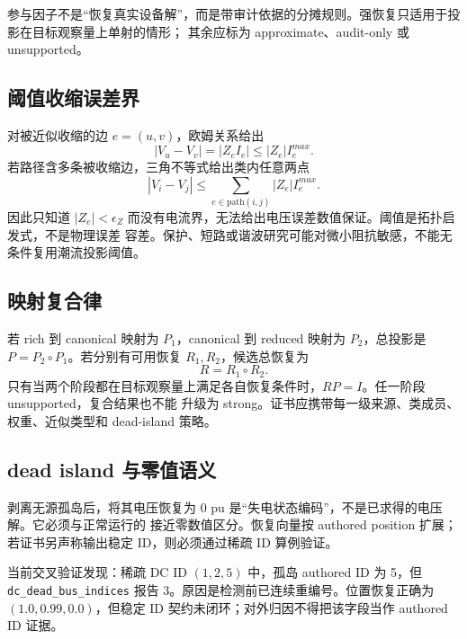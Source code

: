 参与因子不是“恢复真实设备解”，而是带审计依据的分摊规则。强恢复只适用于投影在目标观察量上单射的情形；
其余应标为 approximate、audit-only 或 unsupported。

\subsection{阈值收缩误差界}

对被近似收缩的边 $e=(u,v)$，欧姆关系给出
\begin{equation}
 |V_u-V_v|=|Z_eI_e|\le |Z_e|I_e^{max}.
 \label{eq:model-threshold-bound}
\end{equation}
若路径含多条被收缩边，三角不等式给出类内任意两点
\begin{equation}
 |V_i-V_j|\le\sum_{e\in\mathrm{path}(i,j)}|Z_e|I_e^{max}.
 \label{eq:model-path-error}
\end{equation}
因此只知道 $|Z_e|<\epsilon_Z$ 而没有电流界，无法给出电压误差数值保证。阈值是拓扑启发式，不是物理误差
容差。保护、短路或谐波研究可能对微小阻抗敏感，不能无条件复用潮流投影阈值。

\subsection{映射复合律}

若 rich 到 canonical 映射为 $P_1$，canonical 到 reduced 映射为 $P_2$，总投影是
$P=P_2\circ P_1$。若分别有可用恢复 $R_1,R_2$，候选总恢复为
\begin{equation}
 R=R_1\circ R_2.
 \label{eq:model-recovery-composition}
\end{equation}
只有当两个阶段都在目标观察量上满足各自恢复条件时，$RP=I$。任一阶段 unsupported，复合结果也不能
升级为 strong。证书应携带每一级来源、类成员、权重、近似类型和 dead-island 策略。

\subsection{dead island 与零值语义}

剥离无源孤岛后，将其电压恢复为 $0$ pu 是“失电状态编码”，不是已求得的电压解。它必须与正常运行的
接近零数值区分。恢复向量按 authored position 扩展；若证书另声称输出稳定 ID，则必须通过稀疏 ID 算例验证。

\begin{gapnote}
当前交叉验证发现：稀疏 DC ID $(1,2,5)$ 中，孤岛 authored ID 为 5，但
\texttt{dc\_dead\_bus\_indices} 报告 3。原因是检测前已连续重编号。位置恢复正确为
$(1.0,0.99,0.0)$，但稳定 ID 契约未闭环；对外归因不得把该字段当作 authored ID 证据。
\end{gapnote}

